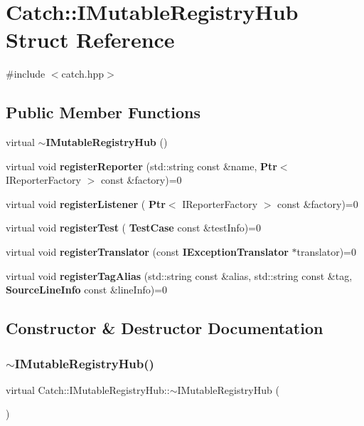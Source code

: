 \section{Catch\+:\+:I\+Mutable\+Registry\+Hub Struct Reference}
\label{struct_catch_1_1_i_mutable_registry_hub}


{\ttfamily \#include $<$catch.\+hpp$>$}

\subsection*{Public Member Functions}
\begin{DoxyCompactItemize}
\item 
virtual \textbf{ $\sim$\+I\+Mutable\+Registry\+Hub} ()
\item 
virtual void \textbf{ register\+Reporter} (std\+::string const \&name, \textbf{ Ptr}$<$ I\+Reporter\+Factory $>$ const \&factory)=0
\item 
virtual void \textbf{ register\+Listener} (\textbf{ Ptr}$<$ I\+Reporter\+Factory $>$ const \&factory)=0
\item 
virtual void \textbf{ register\+Test} (\textbf{ Test\+Case} const \&test\+Info)=0
\item 
virtual void \textbf{ register\+Translator} (const \textbf{ I\+Exception\+Translator} $\ast$translator)=0
\item 
virtual void \textbf{ register\+Tag\+Alias} (std\+::string const \&alias, std\+::string const \&tag, \textbf{ Source\+Line\+Info} const \&line\+Info)=0
\end{DoxyCompactItemize}


\subsection{Constructor \& Destructor Documentation}
\mbox{\label{struct_catch_1_1_i_mutable_registry_hub_a759ca1e044e19f905fb4d306f1367193}} 
\subsubsection{$\sim$\+I\+Mutable\+Registry\+Hub()}
{\footnotesize\ttfamily virtual Catch\+::\+I\+Mutable\+Registry\+Hub\+::$\sim$\+I\+Mutable\+Registry\+Hub (\begin{DoxyParamCaption}{ }\end{DoxyParamCaption})\hspace{0.3cm}{\ttfamily [virtual]}}



